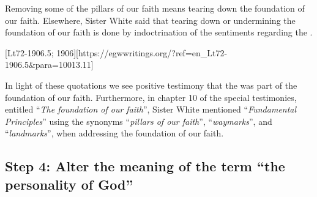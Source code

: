 Removing some of the pillars of our faith means tearing down the foundation of our faith. Elsewhere, Sister White said that tearing down or undermining the foundation of our faith is done by indoctrination of the sentiments regarding the .

[Lt72-1906.5; 1906][https://egwwritings.org/?ref=en\_Lt72-1906.5&para=10013.11]

In light of these quotations we see positive testimony that the  was part of the foundation of our faith. Furthermore, in chapter 10 of the special testimonies, entitled “\textit{The foundation of our faith}”, Sister White mentioned “\textit{Fundamental Principles}” using the synonyms “\textit{pillars of our faith}”, “\textit{waymarks}”, and “\textit{landmarks}”, when addressing the foundation of our faith.

\subsection*{Step 4: Alter the meaning of the term “the personality of God”}

